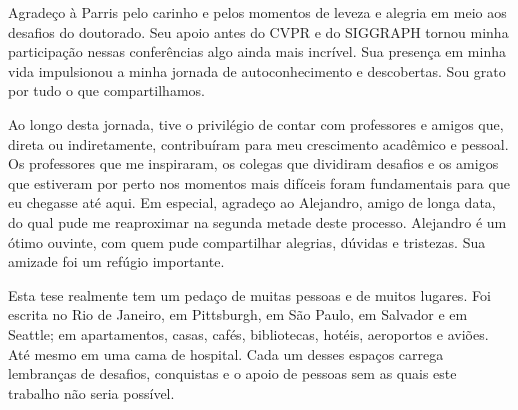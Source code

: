 Agradeço à Parris pelo carinho e pelos momentos de leveza e alegria em meio aos desafios do doutorado. Seu apoio antes do CVPR e do SIGGRAPH tornou minha participação nessas conferências algo ainda mais incrível. Sua presença em minha vida impulsionou a minha jornada de autoconhecimento e descobertas. Sou grato por tudo o que compartilhamos.

Ao longo desta jornada, tive o privilégio de contar com professores e amigos que, direta ou indiretamente, contribuíram para meu crescimento acadêmico e pessoal. Os professores que me inspiraram, os colegas que dividiram desafios e os amigos que estiveram por perto nos momentos mais difíceis foram fundamentais para que eu chegasse até aqui. Em especial, agradeço ao Alejandro, amigo de longa data, do qual pude me reaproximar na segunda metade deste processo. Alejandro é um ótimo ouvinte, com quem pude compartilhar alegrias, dúvidas e tristezas. Sua amizade foi um refúgio importante.

Esta tese realmente tem um pedaço de muitas pessoas e de muitos lugares. Foi escrita no Rio de Janeiro, em Pittsburgh, em São Paulo, em Salvador e em Seattle; em apartamentos, casas, cafés, bibliotecas, hotéis, aeroportos e aviões. Até mesmo em uma cama de hospital. Cada um desses espaços carrega lembranças de desafios, conquistas e o apoio de pessoas sem as quais este trabalho não seria possível.